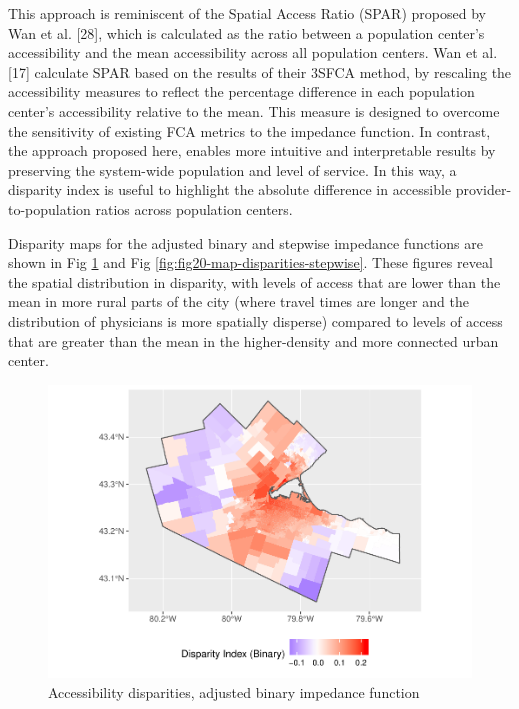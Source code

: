 \documentclass[10pt,letterpaper]{article}
\begin{document}
This approach is reminiscent of the Spatial Access Ratio (SPAR) proposed
by Wan et al. {[}28{]}, which is calculated as the ratio between a
population center's accessibility and the mean accessibility across all
population centers. Wan et al. {[}17{]} calculate SPAR based on the
results of their 3SFCA method, by rescaling the accessibility measures
to reflect the percentage difference in each population center's
accessibility relative to the mean. This measure is designed to overcome
the sensitivity of existing FCA metrics to the impedance function. In
contrast, the approach proposed here, enables more intuitive and
interpretable results by preserving the system-wide population and level
of service. In this way, a disparity index is useful to highlight the
absolute difference in accessible provider-to-population ratios across
population centers.

Disparity maps for the adjusted binary and stepwise impedance functions
are shown in Fig \ref{fig:fig19-map-disparities-binary} and Fig
\ref{fig:fig20-map-disparities-stepwise}. These figures reveal the
spatial distribution in disparity, with levels of access that are lower
than the mean in more rural parts of the city (where travel times are
longer and the distribution of physicians is more spatially disperse)
compared to levels of access that are greater than the mean in the
higher-density and more connected urban center.

\begin{figure}
\includegraphics[width=0.95\linewidth]{Supply_and_Demand_Inflation_in_FCA_Methods_v2.0_files/figure-latex/fig19-map-disparities-binary-1} \caption{\label{fig:fig19-map-disparities-binary}Accessibility disparities, adjusted binary impedance function}\label{fig:fig19-map-disparities-binary}
\end{figure}
\end{document}

